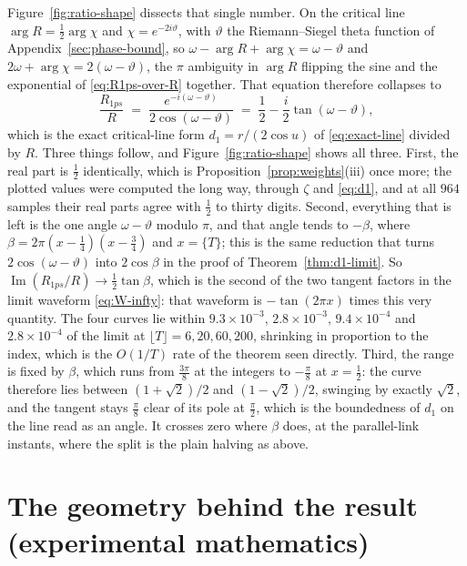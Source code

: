\documentclass[11pt]{article}
\theoremstyle{definition}
\begin{document}
Figure~\ref{fig:ratio-shape} dissects that single number. On the critical
line $\arg R=\tfrac12\arg\chi$ and $\chi=e^{-2i\vartheta}$, with
$\vartheta$ the Riemann--Siegel theta function of
Appendix~\ref{sec:phase-bound}, so
$\omega-\arg R+\arg\chi=\omega-\vartheta$ and
$2\omega+\arg\chi=2(\omega-\vartheta)$, the $\pi$ ambiguity in $\arg R$
flipping the sine and the exponential of \eqref{eq:R1ps-over-R} together.
That equation therefore collapses to
\begin{equation}\label{eq:ratio-tangent}
\frac{R_{1ps}}{R}
\;=\;
\frac{e^{-i(\omega-\vartheta)}}{2\cos(\omega-\vartheta)}
\;=\;
\frac12-\frac{i}{2}\tan(\omega-\vartheta),
\end{equation}
which is the exact critical-line form $d_1=r/(2\cos u)$ of
\eqref{eq:exact-line} divided by $R$. Three things follow, and
Figure~\ref{fig:ratio-shape} shows all three. First, the real part is $\tfrac12$ identically,
which is Proposition~\ref{prop:weights}(iii) once more; the plotted values were
computed the long way, through $\zeta$ and \eqref{eq:d1}, and at all $964$
samples their real parts agree with $\tfrac12$ to thirty digits. Second,
everything that is left is the one angle $\omega-\vartheta$ modulo $\pi$,
and that angle tends to $-\beta$, where
$\beta=2\pi(x-\tfrac14)(x-\tfrac34)$ and $x=\{T\}$; this is the same
reduction that turns $2\cos(\omega-\vartheta)$ into $2\cos\beta$ in the
proof of Theorem~\ref{thm:d1-limit}. So
$\operatorname{Im}(R_{1ps}/R)\to\tfrac12\tan\beta$, which is the second of
the two tangent factors in the limit waveform \eqref{eq:W-infty}: that
waveform is $-\tan(2\pi x)$ times this very quantity. The four
curves lie within $9.3\times10^{-3}$,
$2.8\times10^{-3}$, $9.4\times10^{-4}$ and $2.8\times10^{-4}$ of the limit at
$\lfloor T\rfloor=6,20,60,200$, shrinking in proportion to the index, which
is the $O(1/T)$ rate of the theorem seen directly. Third, the range is
fixed by $\beta$, which runs from $\tfrac{3\pi}{8}$ at the integers to
$-\tfrac{\pi}{8}$ at $x=\tfrac12$: the curve therefore lies between
$(1+\sqrt2)/2$ and $(1-\sqrt2)/2$, swinging by exactly $\sqrt2$, and the
tangent stays $\tfrac{\pi}{8}$ clear of its pole at $\tfrac{\pi}{2}$,
which is the boundedness of $d_1$ on the line read as an angle. It crosses
zero where $\beta$ does, at the parallel-link instants, where the split is
the plain halving as above.

\section{The geometry behind the result (experimental mathematics)}\label{sec:geometry}
\end{document}
